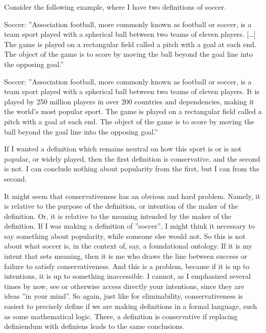 \documentclass[graybox,envcountchap,sectrefs]{svmono}
\begin{document}
Consider the following example, where I have two definitions of soccer.

\begin{svgraybox}
Soccer: ''Association football, more commonly known as football or soccer, is a team sport played with a spherical ball between two teams of eleven players. […] The game is played on a rectangular field called a pitch with a goal at each end. The object of the game is to score by moving the ball beyond the goal line into the opposing goal.'' \cite{wikipedia-association-football}
\end{svgraybox}

\begin{svgraybox}
Soccer: ''Association football, more commonly known as football or soccer, is a team sport played with a spherical ball between two teams of eleven players. It is played by 250 million players in over 200 countries and dependencies, making it the world's most popular sport. The game is played on a rectangular field called a pitch with a goal at each end. The object of the game is to score by moving the ball beyond the goal line into the opposing goal.'' \cite{wikipedia-association-football}
\end{svgraybox}

If I wanted a definition which remains neutral on how this sport is or is not popular, or widely played, then the first definition is conservative, and the second is not. I can conclude nothing about popularity from the first, but I can from the second. 

It might seem that conservativeness has an obvious and hard problem. Namely, it is relative to the purpose of the definition, or intention of the maker of the definition. Or, it is relative to the meaning intended by the maker of the definition. If I was making a definition of ''soccer'', I might think it necessary to say something about popularity, while someone else would not. So this is not about what soccer is, in the context of, say, a foundational ontology. If it is my intent that sets meaning, then it is me who draws the line between success or failure to satisfy conservativeness. And this is a problem, because if it is up to intentions, it is up to something inaccessible. I cannot, as I emphasized several times by now, see or otherwise access directly your intentions, since they are ideas ''in your mind''. So again, just like for eliminability, conservativeness is easiest to precisely define if we are making definitions in a formal language, such as some mathematical logic. There, a definition is conservative if replacing definiendum with definiens leads to the same conclusions.
\end{document}
